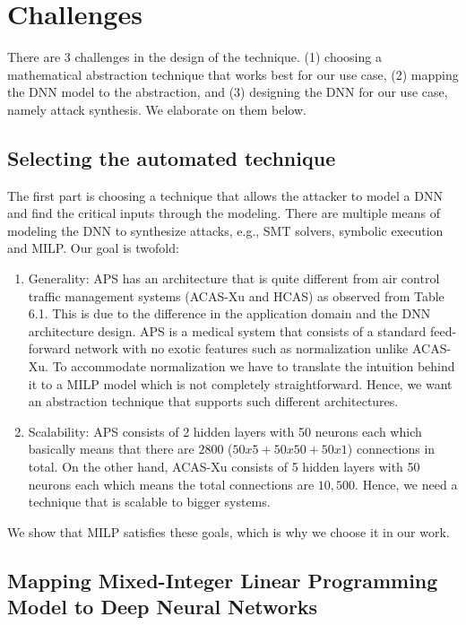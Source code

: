 \section{Challenges}
There are 3 challenges in the design of the technique. 
(1) choosing a mathematical abstraction technique that works best for our use case, 
(2) mapping the \ac{DNN}  model to the abstraction, and 
(3) designing the \ac{DNN}  for our use case, namely attack synthesis. 
We elaborate on them below. 


\subsection{Selecting  the automated technique}
The first part is choosing a technique that allows the attacker to model a DNN and find the critical inputs through the modeling. 
There are multiple means of modeling the DNN to synthesize attacks, e.g., SMT solvers, symbolic execution and MILP.
Our goal is twofold: 
\begin{enumerate}
	\item Generality: \ac{APS} has an architecture that %
	is quite different from air control traffic management systems (\ac{ACAS-Xu} and \ac{HCAS}) as observed from Table 6.1.
	This is due to the difference in the application domain and the \ac{DNN} architecture design. 
	\ac{APS} is a medical system that consists of a standard feed-forward network with no exotic features such as normalization 
	unlike \ac{ACAS-Xu}. 
	To accommodate normalization we have to translate the intuition behind it to a \ac{MILP} model which is not completely straightforward.  
	Hence, we want an abstraction technique that supports such different architectures. 
	\item Scalability: \ac{APS} consists of 2 hidden layers with 50 neurons each which basically means that there are $2800$ ($50x5 + 50x50 + 50x1$) connections in total.
	On the other hand, \ac{ACAS-Xu} consists of 5 hidden layers with 50 neurons each which means the total connections are $10,500$. 
	Hence, we need a technique that is scalable to bigger systems. 
	
\end{enumerate}

 We show that \ac{MILP} satisfies these goals, which is why we choose it in our work. %


\subsection{ Mapping  Mixed-Integer Linear Programming Model to Deep Neural Networks}

